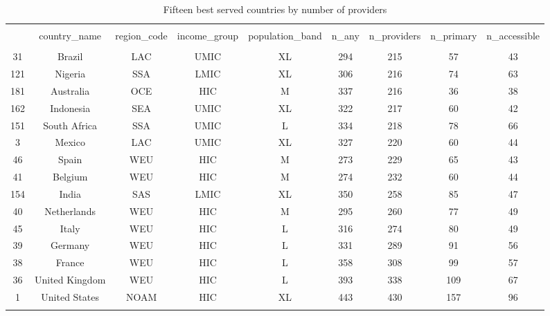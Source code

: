
\begin{table}[!htbp] \centering 
  \caption{Fifteen best served countries by number of providers} 
  \label{} 
\begin{tabular}{@{\extracolsep{5pt}} ccccccccc} 
\\[-1.8ex]\hline 
\hline \\[-1.8ex] 
 & country\_name & region\_code & income\_group & population\_band & n\_any & n\_providers & n\_primary & n\_accessible \\ 
\hline \\[-1.8ex] 
31 & Brazil & LAC & UMIC & XL & 294 & 215 &  57 & 43 \\ 
121 & Nigeria & SSA & LMIC & XL & 306 & 216 &  74 & 63 \\ 
181 & Australia & OCE & HIC & M & 337 & 216 &  36 & 38 \\ 
162 & Indonesia & SEA & UMIC & XL & 322 & 217 &  60 & 42 \\ 
151 & South Africa & SSA & UMIC & L & 334 & 218 &  78 & 66 \\ 
3 & Mexico & LAC & UMIC & XL & 327 & 220 &  60 & 44 \\ 
46 & Spain & WEU & HIC & M & 273 & 229 &  65 & 43 \\ 
41 & Belgium & WEU & HIC & M & 274 & 232 &  60 & 44 \\ 
154 & India & SAS & LMIC & XL & 350 & 258 &  85 & 47 \\ 
40 & Netherlands & WEU & HIC & M & 295 & 260 &  77 & 49 \\ 
45 & Italy & WEU & HIC & L & 316 & 274 &  80 & 49 \\ 
39 & Germany & WEU & HIC & L & 331 & 289 &  91 & 56 \\ 
38 & France & WEU & HIC & L & 358 & 308 &  99 & 57 \\ 
36 & United Kingdom & WEU & HIC & L & 393 & 338 & 109 & 67 \\ 
1 & United States & NOAM & HIC & XL & 443 & 430 & 157 & 96 \\ 
\hline \\[-1.8ex] 
\end{tabular} 
\end{table} 
